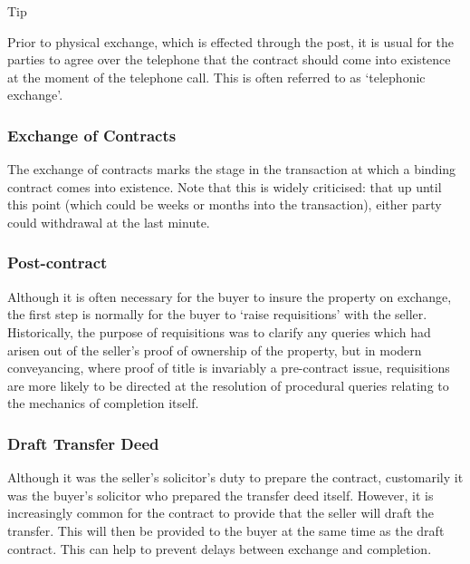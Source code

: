 \documentclass[
]{article}
\newenvironment{env-78e1ee08-0834-4cf6-abc4-429696e06528}
{
    \savenotes\tcolorbox[blanker,breakable,left=5pt,borderline west={2pt}{-4pt}{cyan}]
}
{
    \endtcolorbox\spewnotes
}
\begin{document}
\begin{env-78e1ee08-0834-4cf6-abc4-429696e06528}

Tip

Prior to physical exchange, which is effected through the post, it is
usual for the parties to agree over the telephone that the contract
should come into existence at the moment of the telephone call. This is
often referred to as `telephonic exchange'.

\end{env-78e1ee08-0834-4cf6-abc4-429696e06528}

\hypertarget{exchange-of-contracts}{%
\subsubsection{Exchange of Contracts}\label{exchange-of-contracts}}

The exchange of contracts marks the stage in the transaction at which a
binding contract comes into existence. Note that this is widely
criticised: that up until this point (which could be weeks or months
into the transaction), either party could withdrawal at the last minute.

\hypertarget{post-contract}{%
\subsubsection{Post-contract}\label{post-contract}}

Although it is often necessary for the buyer to insure the property on
exchange, the first step is normally for the buyer to `raise
requisitions' with the seller. Historically, the purpose of requisitions
was to clarify any queries which had arisen out of the seller's proof of
ownership of the property, but in modern conveyancing, where proof of
title is invariably a pre-contract issue, requisitions are more likely
to be directed at the resolution of procedural queries relating to the
mechanics of completion itself.

\hypertarget{draft-transfer-deed}{%
\subsubsection{Draft Transfer Deed}\label{draft-transfer-deed}}

Although it was the seller's solicitor's duty to prepare the contract,
customarily it was the buyer's solicitor who prepared the transfer deed
itself. However, it is increasingly common for the contract to provide
that the seller will draft the transfer. This will then be provided to
the buyer at the same time as the draft contract. This can help to
prevent delays between exchange and completion.
\end{document}
